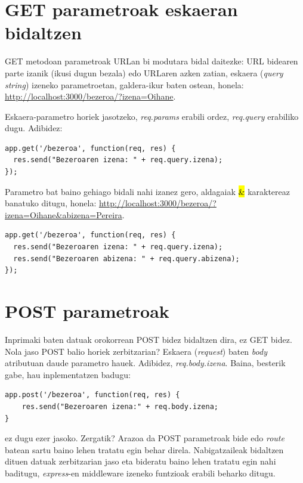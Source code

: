 \section{GET parametroak eskaeran bidaltzen}
GET metodoan parametroak URLan bi modutara bidal daitezke: URL bidearen parte izanik (ikusi dugun bezala) edo URLaren azken zatian, eskaera (\textit{query string}) izeneko parametroetan, galdera-ikur baten ostean, honela:\newline
\href{http://localhost:3000/bezeroa/?izena=Oihane}{http://localhost:3000/bezeroa/?izena=Oihane}.

Eskaera-parametro horiek jasotzeko, \textit{req.params} erabili ordez, \textit{req.query} erabiliko dugu. Adibidez:

\begin{lstlisting}
app.get('/bezeroa', function(req, res) {
  res.send("Bezeroaren izena: " + req.query.izena);
});
\end{lstlisting}

Parametro bat baino gehiago bidali nahi izanez gero, aldagaiak \hl{\&} karaktereaz banatuko ditugu, honela: \href{http://localhost:3000/bezeroa/?izena=Oihane\&abizena=Pereira}{http://localhost:3000/bezeroa/?izena=Oihane\&abizena=Pereira}.

\begin{lstlisting}
app.get('/bezeroa', function(req, res) {
  res.send("Bezeroaren izena: " + req.query.izena);
  res.send("Bezeroaren abizena: " + req.query.abizena);
});
\end{lstlisting}

\section{POST parametroak}

Inprimaki baten datuak orokorrean POST bidez bidaltzen dira, ez GET bidez. Nola jaso POST balio horiek zerbitzarian? Eskaera (\textit{request}) baten \textit{body} atributuan daude parametro hauek. Adibidez, \textit{req.body.izena}. Baina, besterik gabe, hau inplementatzen badugu:

\begin{lstlisting}
app.post('/bezeroa', function(req, res) {
    res.send("Bezeroaren izena:" + req.body.izena;
}
\end{lstlisting}

ez dugu ezer jasoko. Zergatik? Arazoa da POST parametroak bide edo \textit{route} batean sartu baino lehen tratatu egin behar direla. Nabigatzaileak bidaltzen dituen datuak zerbitzarian jaso eta bideratu baino lehen tratatu egin nahi baditugu, \textit{express}-en middleware izeneko funtzioak erabili beharko ditugu.

